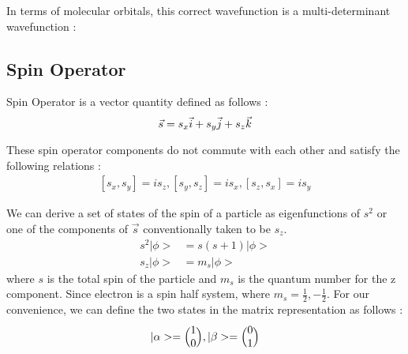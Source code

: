 \documentclass[11pt]{article}   	%
\begin{document}
	In terms of molecular orbitals, this correct  wavefunction is a multi-determinant wavefunction :\\

\subsection{Spin Operator}
	Spin Operator is a vector quantity defined as follows :
	\begin{equation}
		\vec{s}=s_x \vec{i}+s_y\vec{j} + s_z\vec{k}\\
	\end{equation}
	
	These spin operator components do not commute with each other and satisfy the following relations :
	\begin{equation}
	\begin{split}
		[s_x,s_y]=is_z,   
		[s_y,s_z]=is_x,   
		[s_z,s_x]=is_y
	\end{split}
	\end{equation}
	
	We can derive a set of states of the spin of a particle as eigenfunctions of $s^2$ or one of the components of $\vec{s}$ conventionally taken to be $s_z$. \\
	\begin{equation}
	\begin{split}	
		s^2|\phi>&=s(s+1)|\phi>\\
		s_z|\phi>&=m_s|\phi>
	\end{split}
	\end{equation}
	where $s$ is the total spin of the particle and $m_s$ is the quantum number for the z component. 
	Since electron is a spin half system, where $m_s=\frac{1}{2} , -\frac{1}{2}$. 
	For our convenience, we can define the two states in the matrix representation as follows :\\
	\begin{equation}
		|\alpha>=\Big(\begin{matrix} 1\\ 0\end{matrix}\Big), 
		|\beta>=\Big(\begin{matrix} 0\\ 1\end{matrix}\Big)\\
	\end{equation}
	
\end{document}
